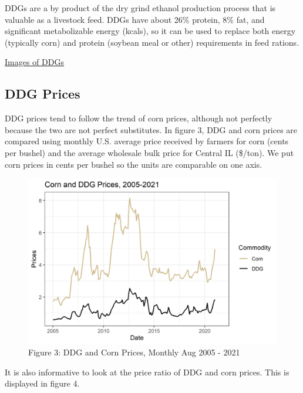 \documentclass[
]{book}
\begin{document}
DDGs are a by product of the dry grind ethanol production process that is valuable as a livestock feed. DDGs have about 26\% protein, 8\% fat, and significant metabolizable energy (kcals), so it can be used to replace both energy (typically corn) and protein (soybean meal or other) requirements in feed rations.

\href{https://www.google.com/search?q=ddgs\&source=lnms\&tbm=isch\&sa=X\&ved=0ahUKEwj4udmomr7JAhWF2B4KHailApcQ_AUICCgC\&biw=1920\&bih=1031\#}{Images of DDGs}

\hypertarget{ddg-prices}{%
\subsection{DDG Prices}\label{ddg-prices}}

DDG prices tend to follow the trend of corn prices, although not perfectly because the two are not perfect substitutes. In figure 3, DDG and corn prices are compared using monthly U.S. average price received by farmers for corn (cents per bushel) and the average wholesale bulk price for Central IL (\$/ton). We put corn prices in cents per bushel so the units are comparable on one axis.

\begin{figure}
\centering
\includegraphics{assets/CornDDGPrices.png}
\caption{Figure 3: DDG and Corn Prices, Monthly Aug 2005 - 2021}
\end{figure}

It is also informative to look at the price ratio of DDG and corn prices. This is displayed in figure 4.
\end{document}
